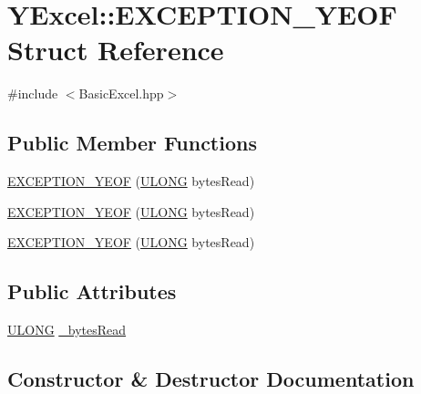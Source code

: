\hypertarget{struct_y_excel_1_1_e_x_c_e_p_t_i_o_n___y_e_o_f}{}\section{Y\+Excel\+:\+:E\+X\+C\+E\+P\+T\+I\+O\+N\+\_\+\+Y\+E\+O\+F Struct Reference}
\label{struct_y_excel_1_1_e_x_c_e_p_t_i_o_n___y_e_o_f}


{\ttfamily \#include $<$Basic\+Excel.\+hpp$>$}

\subsection*{Public Member Functions}
\begin{DoxyCompactItemize}
\item 
\hyperlink{struct_y_excel_1_1_e_x_c_e_p_t_i_o_n___y_e_o_f_a5e151258bf9b562518e267282558960a}{E\+X\+C\+E\+P\+T\+I\+O\+N\+\_\+\+Y\+E\+O\+F} (\hyperlink{_basic_excel_8hpp_abe09d1bea023be6a07cbadde8e955435}{U\+L\+O\+N\+G} bytes\+Read)
\item 
\hyperlink{struct_y_excel_1_1_e_x_c_e_p_t_i_o_n___y_e_o_f_a5e151258bf9b562518e267282558960a}{E\+X\+C\+E\+P\+T\+I\+O\+N\+\_\+\+Y\+E\+O\+F} (\hyperlink{_basic_excel_8hpp_abe09d1bea023be6a07cbadde8e955435}{U\+L\+O\+N\+G} bytes\+Read)
\item 
\hyperlink{struct_y_excel_1_1_e_x_c_e_p_t_i_o_n___y_e_o_f_a5e151258bf9b562518e267282558960a}{E\+X\+C\+E\+P\+T\+I\+O\+N\+\_\+\+Y\+E\+O\+F} (\hyperlink{_basic_excel_8hpp_abe09d1bea023be6a07cbadde8e955435}{U\+L\+O\+N\+G} bytes\+Read)
\end{DoxyCompactItemize}
\subsection*{Public Attributes}
\begin{DoxyCompactItemize}
\item 
\hyperlink{_basic_excel_8hpp_abe09d1bea023be6a07cbadde8e955435}{U\+L\+O\+N\+G} \hyperlink{struct_y_excel_1_1_e_x_c_e_p_t_i_o_n___y_e_o_f_a005cf5e9f84a7082bcc8b568e81df74b}{\+\_\+bytes\+Read}
\end{DoxyCompactItemize}


\subsection{Constructor \& Destructor Documentation}
\hypertarget{struct_y_excel_1_1_e_x_c_e_p_t_i_o_n___y_e_o_f_a5e151258bf9b562518e267282558960a}{}
